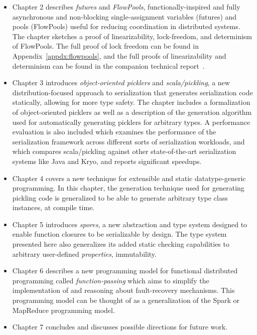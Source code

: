 \begin{itemize}

	\item Chapter 2 describes {\em futures} and {\em FlowPools}, functionally-inspired
	and fully asynchronous and non-blocking single-assignment variables (futures)
	and pools (FlowPools) useful for reducing coordination in distributed systems.
	The chapter sketches a proof of linearizability, lock-freedom, and determinism
	of FlowPools. The full proof of lock freedom can be found in
	Appendix~\ref{appdx:flowpools}, and the full proofs of linearizability and
	determinism can be found in the companion technical report~\cite{Prokopec12}.

	\item Chapter 3 introduces {\em object-oriented picklers} and {\em
	scala/pickling}, a new distribution-focused approach to serialization that
	generates serialization code statically, allowing for more type safety. The
	chapter includes a formalization of object-oriented picklers as well as a
	description of the generation algorithm used for automatically generating
	picklers for arbitrary types. A performance evaluation is also included which
	examines the performance of the serialization framework across different sorts
	of serialization workloads, and which compares scala/pickling against other
	state-of-the-art serialization systems like Java and Kryo, and reports
	significant speedups.

	\item Chapter 4 covers a new technique for extensible and static datatype-generic programming. In this chapter, the generation technique used for
	generating pickling code is generalized to be able to generate arbitrary type
	class instances, at compile time.

	\item Chapter 5 introduces {\em spores}, a new abstraction and type system
	designed to enable function closures to be serializable by design. The type
	system presented here also generalizes its added static checking capabilities
	to arbitrary user-defined {\em properties}, \eg immutability.

	\item Chapter 6 describes a new programming model for functional distributed
	programming called {\em function-passing} which aims to simplify the
	implementation of and reasoning about fault-recovery mechanisms.
  This programming model can be thought of as a generalization of the Spark
	or MapReduce programming model.

	\item Chapter 7 concludes and discusses possible directions for future work.

\end{itemize}


